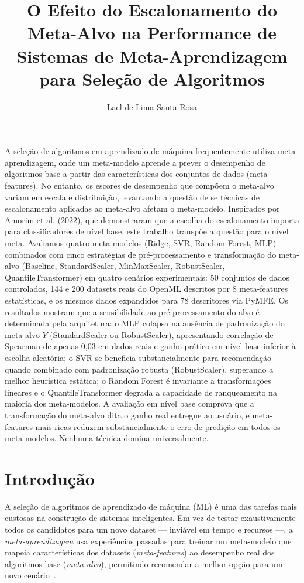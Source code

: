 \documentclass[12pt]{article}
\title{O Efeito do Escalonamento do Meta-Alvo na Performance de Sistemas de Meta-Aprendizagem para Seleção de Algoritmos}
\author{Lael de Lima Santa Rosa\inst{1}}
\begin{document}
\maketitle
\begin{resumo}
A seleção de algoritmos em aprendizado de máquina frequentemente utiliza meta-aprendizagem, onde um meta-modelo aprende a prever o desempenho de algoritmos base a partir das características dos conjuntos de dados (meta-features). No entanto, os escores de desempenho que compõem o meta-alvo variam em escala e distribuição, levantando a questão de se técnicas de escalonamento aplicadas ao meta-alvo afetam o meta-modelo. Inspirados por Amorim et al. (2022), que demonstraram que a escolha do escalonamento importa para classificadores de nível base, este trabalho transpõe a questão para o nível meta. Avaliamos quatro meta-modelos (Ridge, SVR, Random Forest, MLP) combinados com cinco estratégias de pré-processamento e transformação do meta-alvo (Baseline, StandardScaler, MinMaxScaler, RobustScaler, QuantileTransformer) em quatro cenários experimentais: 50 conjuntos de dados controlados, 144 e 200 datasets reais do OpenML descritos por 8 meta-features estatísticas, e os mesmos dados expandidos para 78 descritores via PyMFE. Os resultados mostram que a sensibilidade ao pré-processamento do alvo é determinada pela arquitetura: o MLP colapsa na ausência de padronização do meta-alvo $Y$ (StandardScaler ou RobustScaler), apresentando correlação de Spearman de apenas 0,03 em dados reais e ganho prático em nível base inferior à escolha aleatória; o SVR se beneficia substancialmente para recomendação quando combinado com padronização robusta (RobustScaler), superando a melhor heurística estática; o Random Forest é invariante a transformações lineares e o QuantileTransformer degrada a capacidade de ranqueamento na maioria dos meta-modelos. A avaliação em nível base comprova que a transformação do meta-alvo dita o ganho real entregue ao usuário, e meta-features mais ricas reduzem substancialmente o erro de predição em todos os meta-modelos. Nenhuma técnica domina universalmente.
\end{resumo}

\section{Introdução}

A seleção de algoritmos de aprendizado de máquina (ML) é uma das tarefas mais custosas na construção de sistemas inteligentes. Em vez de testar exaustivamente todos os candidatos para um novo dataset --- inviável em tempo e recursos ---, a \textit{meta-aprendizagem} usa experiências passadas para treinar um meta-modelo que mapeia características dos datasets (\textit{meta-features}) ao desempenho real dos algoritmos base (\textit{meta-alvo}), permitindo recomendar a melhor opção para um novo cenário~\cite{vanschoren2018meta}.
\end{document}
